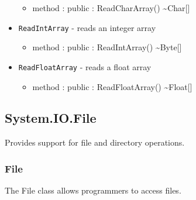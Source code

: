 \documentclass[11pt]{article}
\begin{document}
\begin{itemize}
\begin{itemize}
  \item method : public : ReadCharArray() \textasciitilde Char[]
  \end{itemize}
\item \texttt{ReadIntArray} - reads an integer array
  \begin{itemize}
  \item method : public : ReadIntArray() \textasciitilde Byte[]
  \end{itemize}
\item \texttt{ReadFloatArray} - reads a float array
  \begin{itemize}
  \item method : public : ReadFloatArray() \textasciitilde Float[]
  \end{itemize}
\end{itemize}

\subsection{System.IO.File}
Provides support for file and directory operations.

\subsubsection{File}
The File class allows programmers to access files.
\end{document}
